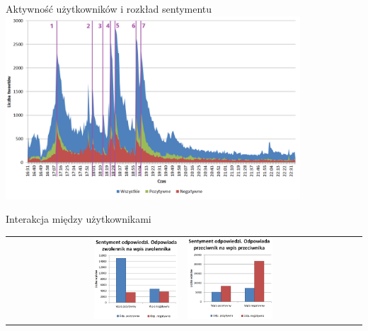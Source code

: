 \documentclass{beamer}
\begin{document}
\begin{frame}{Aktywność użytkowników i rozkład sentymentu}
\includegraphics[width=11cm]{img/tweety-w-meczu-nums.png}
\end{frame} 

\begin{frame}{Interakcja między użytkownikami}
\begin{adjustwidth}{-5cm}{-5cm}
\begin{table}
\begin{tabular}{rl}
\includegraphics[width=0.50\textwidth]{img/reply-sentiment-zwolennik-zwolennik.PNG}
&
\includegraphics[width=0.50\textwidth]{img/reply-sentiment-przeciwnik-przeciwnik.PNG}
\end{tabular}
\end{table}
\end{adjustwidth}
\end{frame}
\end{document}
